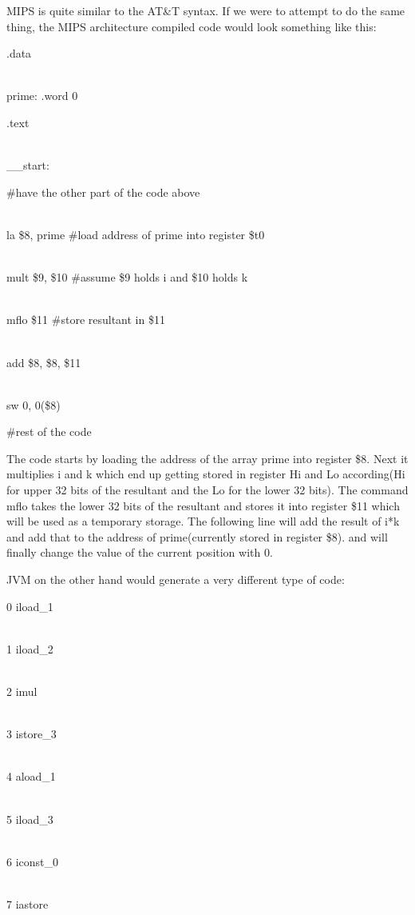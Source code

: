 \documentclass[11pt]{article}
\begin{document}
MIPS is quite similar to the AT\&T syntax. If we were to attempt to do the same thing, the MIPS architecture compiled code would look something like this:


.data

\\\hspace*{.4 in}prime: .word 0


.text

\\\_\_start:

\begin{myindentpar}{.4 in}

\#have the other part of the code above

\\la \$8, prime \#load address of prime into register \$t0

\\mult \$9, \$10 \#assume \$9 holds i and \$10 holds k

\\mflo \$11 \#store resultant in \$11

\\add \$8, \$8, \$11

\\sw 0, 0(\$8)

\#rest of the code

\end{myindentpar}


The code starts by loading the address of the array prime into register \$8. Next it multiplies i and k which end up getting stored in register Hi and Lo according(Hi for upper 32 bits of the resultant and the Lo for the lower 32 bits). The command mflo takes the lower 32 bits of the resultant and stores it into register \$11 which will be used as a temporary storage. The following line will add the result of i*k and add that to the address of prime(currently stored in register \$8). and will finally change the value of the current position with 0.


JVM on the other hand would generate a very different type of code:

\begin{myindentpar}{.4 in}

0 iload\_1

\\1  iload\_2

\\2  imul

\\3  istore\_3

\\4  aload\_1

\\5  iload\_3

\\6  iconst\_0

\\7  iastore

\end{myindentpar}
\end{document}

